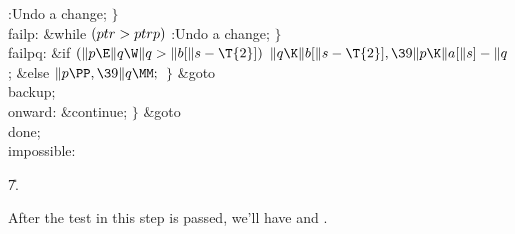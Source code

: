 :Undo a change\X;\2\6
\4${}\}{}$\2\6
\4\\{failp}:\5
\&{while} ${}(\\{ptr}>\\{ptrp}){}$\1\5
:Undo a change\X;\2\6
\4${}\}{}$\2\6
\4\\{failpq}:\5
\&{if} ${}(\|p\E\|q\W\|q>\|b[\|s-\T{2}]){}$\1\5
${}\|q\K\|b[\|s-\T{2}],\39\|p\K\|a[\|s]-\|q{}$;\5
\2\&{else}\1\5
${}\|p\PP,\39\|q\MM;{}$\2\6
\4${}\}{}$\2\6
\&{goto} \\{backup};\6
\4\\{onward}:\5
\&{continue};\6
\4${}\}{}$\2\6
\&{goto} \\{done};\6
\4\\{impossible}:\par
\U7.\fi

After the test in this step is passed, we'll have  and .


